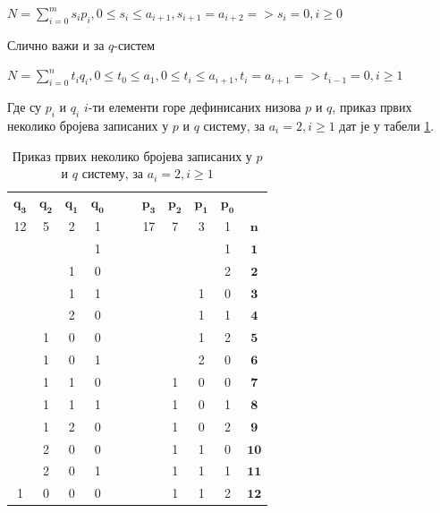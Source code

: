 \documentclass[a4paper]{article}
\begin{document}
\begin{center}
	$ N = \sum_{i=0}^{m} s_{i}p_{i}, 0 \le s_{i} \le a_{i+1}, s_{i+1} = a_{i+2} => s_{i}=0 , i \ge 0 $
\end{center}

Слично важи и за $ q $-систем

\begin{center}
	$ N = \sum_{i=0}^{n} t_{i}q_{i}, 0 \le t_{0} \le a_{1}, 0 \le t_{i} \le a_{i+1}, t_{i} = a_{i+1} => t_{i-1}=0 , i \ge 1 $
\end{center}

Где су $ p_{i} $ и $ q_{i} $ $ i $-ти елементи горе дефинисаних низова $ p $ и $ q $, приказ првих неколико бројева записаних у $ p $ и $ q $ систему, за $ a_{i} = 2 , i \ge 1 $ дат је у табели \ref{tab:p_q_sistem}.

\begin{table}[h!]
	\caption{Приказ првих неколико бројева записаних у $ p $ и $ q $ систему, за $ a_{i} = 2 , i \ge 1 $}
	\label{tab:p_q_sistem}
	\begin{center}
		\begin{tabular}{ | c | c | c | c | c  c | c | c | c | c | c |}
			\hline
			{$ \mathbf{q_{3}} $} &  {$ \mathbf{q_{2}} $} &  {$ \mathbf{q_{1}} $} &  {$ \mathbf{q_{0}} $} & & &  {$ \mathbf{p_{3}} $} &  {$ \mathbf{p_{2}} $} &  {$ \mathbf{p_{1}} $} &  {$ \mathbf{p_{0}} $} &\\
			12 & 5 & 2 & 1 & & & 17 & 7 & 3 & 1 &  {$ \mathbf{n} $}\\
			\hline
			&  &  & 1 & & &  &  &  & 1 & {$ \mathbf{1} $}\\
			&  & 1 & 0 & & &  &  &  & 2 & {$ \mathbf{2} $}\\
			&  & 1 & 1 & & &  &  & 1 & 0 &  {$ \mathbf{3} $}\\
			&  & 2 & 0 & & &  &  & 1 & 1 &  {$ \mathbf{4} $}\\
			& 1 & 0 & 0 & & &  &  & 1 & 2 &  {$ \mathbf{5} $}\\
			& 1 & 0 & 1 & & &  &  & 2 & 0 &  {$ \mathbf{6} $}\\
			& 1 & 1 & 0 & & &  & 1 & 0 & 0 &  {$ \mathbf{7} $}\\
			& 1 & 1 & 1 & & &  & 1 & 0 & 1 &  {$ \mathbf{8} $}\\
			& 1 & 2 & 0 & & &  & 1 & 0 & 2 &  {$ \mathbf{9} $}\\
			& 2 & 0 & 0 & & &  & 1 & 1 & 0 &  {$ \mathbf{10} $}\\
			& 2 & 0 & 1 & & &  & 1 & 1 & 1 &  {$ \mathbf{11} $}\\
			 1 & 0 & 0 & 0 & & & & 1 & 1 & 2 &  {$ \mathbf{12} $}\\

\end{tabular}
\end{center}
\end{table}
\end{document}
